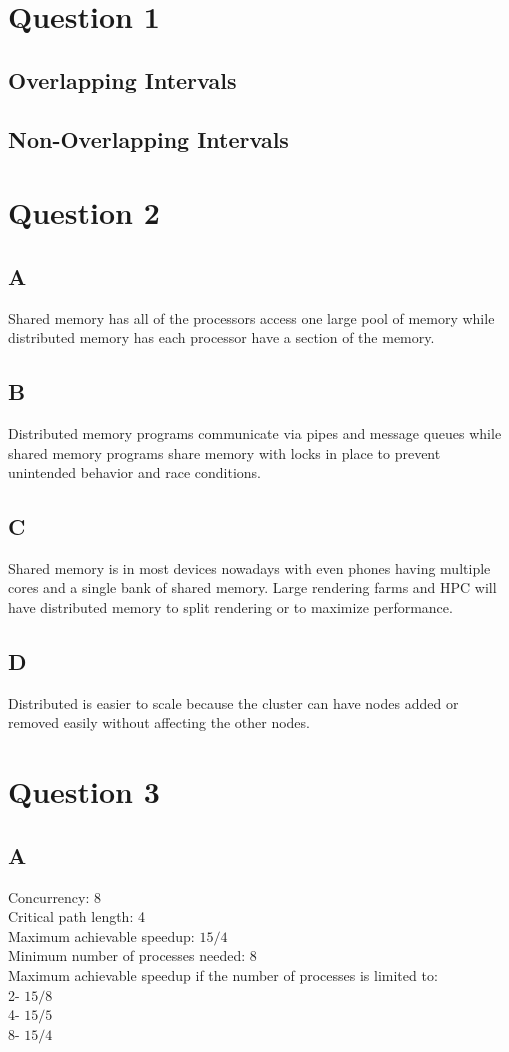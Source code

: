 \documentclass[12pt]{article}
\begin{document}
    \section{Question 1}
    \subsection{Overlapping Intervals}
    \subsection{Non-Overlapping Intervals}
    \section{Question 2}
    \subsection*{A}
    Shared memory has all of the processors access one large pool of memory while distributed memory has each processor have a section of the memory.
    \subsection*{B}
    Distributed memory programs communicate via pipes and message queues while shared memory programs share memory with locks in place to prevent unintended behavior and race conditions.
    \subsection*{C}
    Shared memory is in most devices nowadays with even phones having multiple cores and a single bank of shared memory. Large rendering farms and HPC will have distributed memory to split rendering or to maximize performance.
    \subsection*{D}
    Distributed is easier to scale because the cluster can have nodes added or removed easily without affecting the other nodes.
    \section{Question 3}
    \subsection*{A}
    Concurrency: 8\\
    Critical path length: 4\\
    Maximum achievable speedup: \(15/4\) \\
    Minimum number of processes needed: 8\\
    Maximum achievable speedup if the number of processes is limited to: \\
        2- \(15/8\)\\
        4- \(15/5\)\\ 
        8- \(15/4\)\\
\end{document}
